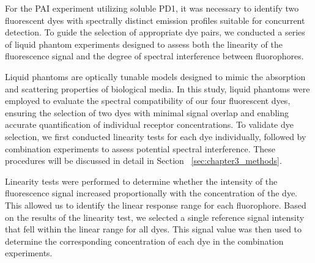 For the PAI experiment utilizing soluble PD1, it was necessary to identify two fluorescent dyes with spectrally distinct emission profiles suitable for concurrent detection. To guide the selection of appropriate dye pairs, we conducted a series of liquid phantom experiments designed to assess both the linearity of the fluorescence signal and the degree of spectral interference between fluorophores. 

Liquid phantoms are optically tunable models designed to mimic the absorption and scattering properties of biological media. In this study, liquid phantoms were employed to evaluate the spectral compatibility of our four fluorescent dyes, ensuring the selection of two dyes with minimal signal overlap and enabling accurate quantification of individual receptor concentrations. To validate dye selection, 
we first conducted linearity tests for each dye individually, followed by combination experiments to assess potential spectral interference. These procedures will be discussed in detail in Section ~\ref{sec:chapter3_methods}.

Linearity tests were performed to determine whether the intensity of the fluorescence signal increased proportionally with the concentration of the dye. This allowed us to identify the linear response range for each fluorophore. Based on the results of the linearity test, we selected a single reference signal
intensity that fell within the linear range for all dyes. This signal value was then used to determine the corresponding concentration of each dye in the combination experiments.